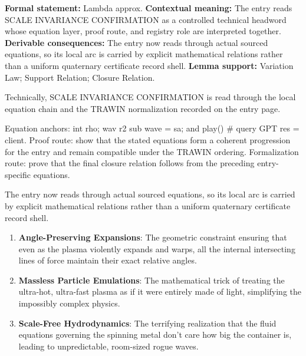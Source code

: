 \begingroup\footnotesize\setlength{\emergencystretch}{3em}\sloppy
\textbf{Formal statement:} Lambda approx. \textbf{Contextual meaning:} The entry reads SCALE INVARIANCE CONFIRMATION as a controlled technical headword whose equation layer, proof route, and registry role are interpreted together. \textbf{Derivable consequences:} The entry now reads through actual sourced equations, so its local arc is carried by explicit mathematical relations rather than a uniform quaternary certificate record shell. \textbf{Lemma support:} Variation Law; Support Relation; Closure Relation.\par
\endgroup

Technically, SCALE INVARIANCE CONFIRMATION is read through the local equation chain and the TRAWIN normalization recorded on the entry page.

Equation anchors: int rho; wav r2 sub wave = sa; and play() \# query GPT res = client. Proof route: show that the stated equations form a coherent progression for the entry and remain compatible under the TRAWIN ordering. Formalization route: prove that the final closure relation follows from the preceding entry-specific equations.

The entry now reads through actual sourced equations, so its local arc is carried by explicit mathematical relations rather than a uniform quaternary certificate record shell.
\endgroup

\begin{enumerate}[leftmargin=1.6em,itemsep=6pt,topsep=4pt]
\item \textbf{Angle-Preserving Expansions}: The geometric constraint ensuring that even as the plasma violently expands and warps, all the internal intersecting lines of force maintain their exact relative angles.
\item \textbf{Massless Particle Emulations}: The mathematical trick of treating the ultra-hot, ultra-fast plasma as if it were entirely made of light, simplifying the impossibly complex physics.
\item \textbf{Scale-Free Hydrodynamics}: The terrifying realization that the fluid equations governing the spinning metal don't care how big the container is, leading to unpredictable, room-sized rogue waves.
\end{enumerate}

